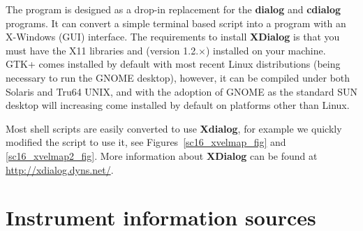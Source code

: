 \documentclass[twoside,11pt]{starlink}
\begin{document}
The  program
is designed as a drop-in replacement for the \textbf{dialog} and \textbf{cdialog} programs.  It can convert a simple terminal based script into
a program with an X-Windows (GUI) interface.  The requirements to
install \textbf{XDialog} is that you must have the X11 libraries and
 (version
1.2.$\times$) installed on your machine.  GTK+ comes installed by
default with most recent Linux distributions (being necessary to run
the {{\footnotesize GNOME}\normalsize} desktop), however, it can be
compiled under both Solaris and Tru64 UNIX, and with the adoption of
{{\footnotesize GNOME}\normalsize} as the standard SUN desktop will
increasing come installed by default on platforms other than Linux.



Most shell scripts are easily converted to use \textbf{Xdialog}, for
example we quickly modified the 
script to use it, see
Figures~\ref{sc16_xvelmap_fig} and \ref{sc16_xvelmap2_fig}.
More information about \textbf{XDialog} can be found at
\url{http://xdialog.dyns.net/}.



\newpage
\section{Instrument information sources\label{sc16_available}}
\end{document}
